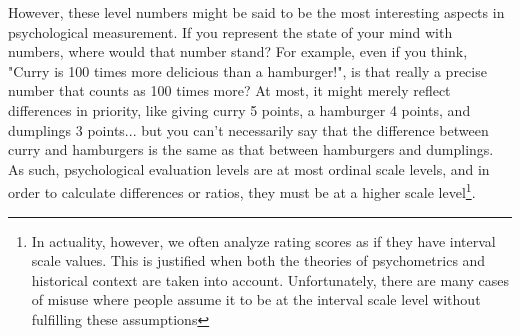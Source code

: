\documentclass{ltjsbook}
\begin{document}


However, these level numbers might be said to be the most interesting aspects in psychological measurement. If you represent the state of your mind with numbers, where would that number stand? For example, even if you think, "Curry is 100 times more delicious than a hamburger!", is that really a precise number that counts as 100 times more? At most, it might merely reflect differences in priority, like giving curry 5 points, a hamburger 4 points, and dumplings 3 points... but you can't necessarily say that the difference between curry and hamburgers is the same as that between hamburgers and dumplings. As such, psychological evaluation levels are at most ordinal scale levels, and in order to calculate differences or ratios, they must be at a higher scale level\footnote{In actuality, however, we often analyze rating scores as if they have interval scale values. This is justified when both the theories of psychometrics and historical context are taken into account. Unfortunately, there are many cases of misuse where people assume it to be at the interval scale level without fulfilling these assumptions}.
\end{document}
